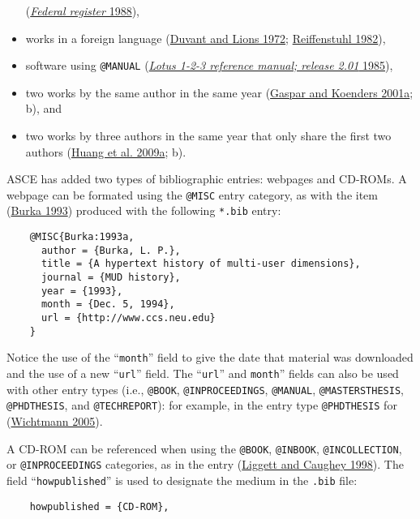 \documentclass[
  NewProceedings,
  letterpaper]{./assets/ascelike-new}
\begin{document}
\begin{itemize}
  (\protect\hyperlink{ref-FR:1968a}{\emph{Federal register} 1988}),
\item
  works in a foreign language
  (\protect\hyperlink{ref-Duvant:1972a}{Duvant and Lions 1972};
  \protect\hyperlink{ref-Reiffenstuhl:1982a}{Reiffenstuhl 1982}),
\item
  software using \texttt{@MANUAL}
  (\protect\hyperlink{ref-Lotus:1985a}{\emph{Lotus 1-2-3 reference
  manual; release 2.01} 1985}),
\item
  two works by the same author in the same year
  (\protect\hyperlink{ref-Gaspar:2001b}{Gaspar and Koenders 2001a}; b),
  and
\item
  two works by three authors in the same year that only share the first
  two authors (\protect\hyperlink{ref-Huang2009a}{Huang et al. 2009a};
  b).
\end{itemize}

ASCE has added two types of bibliographic entries: webpages and CD-ROMs.
A webpage can be formated using the \texttt{@MISC} entry category, as
with the item (\protect\hyperlink{ref-Burka:1993a}{Burka 1993}) produced
with the following \texttt{*.bib} entry:

\begin{verbatim}
    @MISC{Burka:1993a,
      author = {Burka, L. P.},
      title = {A hypertext history of multi-user dimensions},
      journal = {MUD history},
      year = {1993},
      month = {Dec. 5, 1994},
      url = {http://www.ccs.neu.edu}
    }
\end{verbatim}

Notice the use of the ``\texttt{month}'' field to give the date that
material was downloaded and the use of a new ``\texttt{url}'' field. The
``\texttt{url}'' and \texttt{month}'' fields can also be used with other
entry types (i.e., \texttt{@BOOK}, \texttt{@INPROCEEDINGS},
\texttt{@MANUAL}, \texttt{@MASTERSTHESIS}, \texttt{@PHDTHESIS}, and
\texttt{@TECHREPORT}): for example, in the entry type
\texttt{@PHDTHESIS} for
(\protect\hyperlink{ref-Wichtmann:2005a}{Wichtmann 2005}).

A CD-ROM can be referenced when using the \texttt{@BOOK},
\texttt{@INBOOK}, \texttt{@INCOLLECTION}, or \texttt{@INPROCEEDINGS}
categories, as in the entry
(\protect\hyperlink{ref-Liggett:1998a}{Liggett and Caughey 1998}). The
field ``\texttt{howpublished}'' is used to designate the medium in the
\texttt{.bib} file:

\begin{verbatim}
    howpublished = {CD-ROM},
\end{verbatim}
\end{document}
